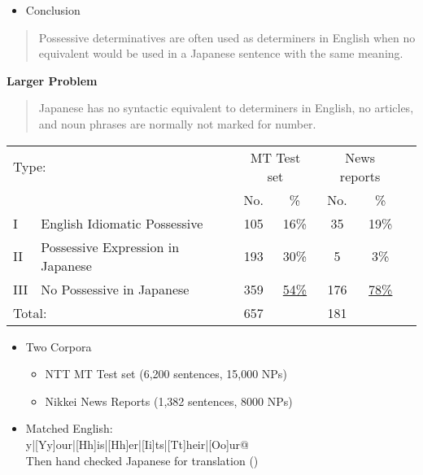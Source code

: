 \documentclass[a4paper,landscape,headrule,footrule,dvips]{foils}
\begin{document}
\begin{CJK}{UTF8}{min}
\begin{itemize}
\item Conclusion 
\end{itemize}





\begin{quote}
  Possessive determinatives are often used as determiners in English
  when no equivalent would be used in a Japanese sentence with the
  same meaning.
\end{quote}
{\bf Larger Problem}
\begin{quote}
  Japanese has no syntactic equivalent to determiners in English,
  no articles, and noun phrases are normally not marked for number.
\end{quote}




\noindent\begin{tabular}{llccccc}
  \multicolumn{2}{l}{Type:}  &
  \multicolumn{2}{c}{MT Test set} &
  \multicolumn{2}{c}{News reports} \\
   & & No.  & \%  & No.  & \%  \\ \hline
   I & English Idiomatic Possessive & 105 & 16\% & 35 & 19\% \\
   II & Possessive Expression in Japanese & 193 & 30\% & 5 & 3\% \\
   III &No Possessive in Japanese & 359 &  \underline{54\%}& 176 & \underline{78\%} \\
  \multicolumn{2}{l}{Total:} &  657 & & 181 & 
\end{tabular}

\begin{itemize}
\item Two Corpora
  \begin{itemize}
  \item NTT MT Test set (6,200 sentences, 15,000 NPs)
  \item Nikkei News Reports (1,382 sentences, 8000 NPs)
  \end{itemize}
\item Matched English:
\\  \verb@[Mm]y|[Yy]our|[Hh]is|[Hh]er|[Ii]ts|[Tt]heir|[Oo]ur@
\\ Then hand checked Japanese for translation ()
\end{itemize}


\end{CJK}
\end{document}
